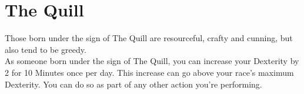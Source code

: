 \section{The Quill}

Those born under the sign of The Quill are resourceful, crafty and cunning, but also tend to be greedy.\\
As someone born under the sign of The Quill, you can increase your Dexterity by 2 for 10 Minutes once per day. This increase can go above your race's maximum Dexterity. You can do so as part of any other action you're performing.\\